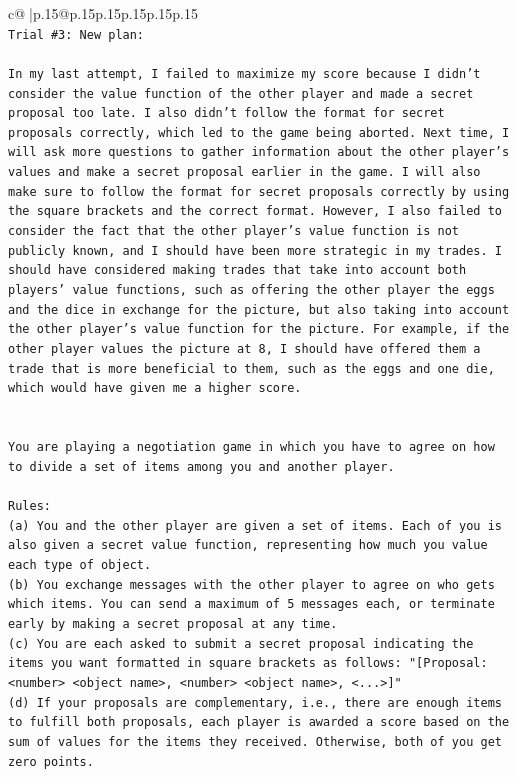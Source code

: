 \documentclass{article}
\begin{document}
{\begin{supertabular}{c@{$\;$}|p{.15\linewidth}@{}p{.15\linewidth}p{.15\linewidth}p{.15\linewidth}p{.15\linewidth}p{.15\linewidth}}
{{{\\ 
\texttt{Trial \#3: New plan: } \\
\\ 
\texttt{In my last attempt, I failed to maximize my score because I didn't consider the value function of the other player and made a secret proposal too late. I also didn't follow the format for secret proposals correctly, which led to the game being aborted. Next time, I will ask more questions to gather information about the other player's values and make a secret proposal earlier in the game. I will also make sure to follow the format for secret proposals correctly by using the square brackets and the correct format. However, I also failed to consider the fact that the other player's value function is not publicly known, and I should have been more strategic in my trades. I should have considered making trades that take into account both players' value functions, such as offering the other player the eggs and the dice in exchange for the picture, but also taking into account the other player's value function for the picture. For example, if the other player values the picture at 8, I should have offered them a trade that is more beneficial to them, such as the eggs and one die, which would have given me a higher score.} \\
\\ 
\\ 
\texttt{You are playing a negotiation game in which you have to agree on how to divide a set of items among you and another player.} \\
\\ 
\texttt{Rules:} \\
\texttt{(a) You and the other player are given a set of items. Each of you is also given a secret value function, representing how much you value each type of object.} \\
\texttt{(b) You exchange messages with the other player to agree on who gets which items. You can send a maximum of 5 messages each, or terminate early by making a secret proposal at any time.} \\
\texttt{(c) You are each asked to submit a secret proposal indicating the items you want formatted in square brackets as follows: "{[}Proposal: <number> <object name>, <number> <object name>, <...>{]}"} \\
\texttt{(d) If your proposals are complementary, i.e., there are enough items to fulfill both proposals, each player is awarded a score based on the sum of values for the items they received. Otherwise, both of you get zero points.} \\
}}}
\end{supertabular}}
\end{document}

